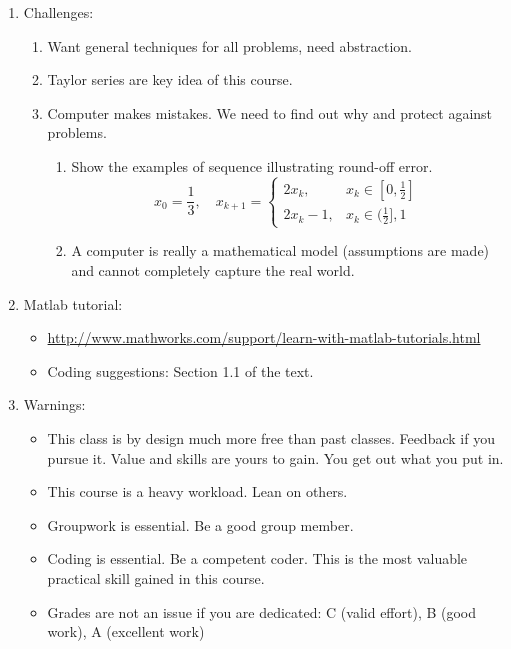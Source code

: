 \documentclass{article}
\theoremstyle{remark}
\begin{document}
\begin{enumerate}
\item Challenges:
\begin{enumerate}
\item Want general techniques for all problems, need abstraction.
\item Taylor series are key idea of this course. 
\item Computer makes mistakes. We need to find out why and protect against problems.
\begin{enumerate}
\item Show the examples of sequence illustrating round-off error.
\[
x_0 = \frac{1}{3}, \quad x_{k+1} = 
\begin{cases}
2x_k , &x_k \in [0,\frac{1}{2}] \\
2x_k-1 , &x_k \in (\frac{1}{2}],1 
\end{cases}
\]
\item A computer is really a mathematical model (assumptions are made) and cannot completely capture the real world.
\end{enumerate}
\end{enumerate}

\item Matlab tutorial:
\begin{itemize}
\item \url{http://www.mathworks.com/support/learn-with-matlab-tutorials.html}
\item Coding suggestions: Section 1.1 of the text.
\end{itemize}

\item Warnings:
\begin{itemize}
\item This class is by design much more free than past classes. Feedback if you pursue it. Value and skills are yours to gain. You get out what you put in.
\item This course is a heavy workload. Lean on others.	
\item Groupwork is essential. Be a good group member.
\item Coding is essential. Be a competent coder. This is the most valuable practical skill gained in this course.
\item Grades are not an issue if you are dedicated: C (valid effort), B (good work), A (excellent work)
\end{itemize}
\end{enumerate}
\end{document}
